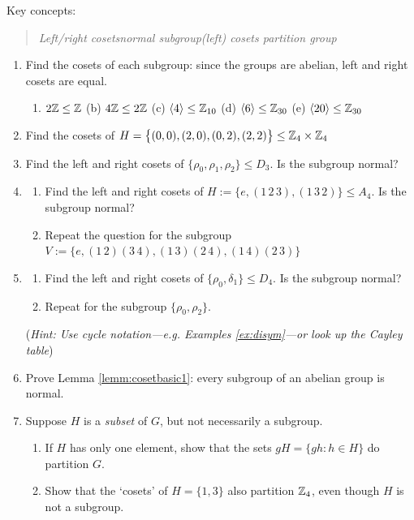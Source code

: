 \begin{exercises}{}{}
	Key concepts:
	\begin{quote}
		\emph{Left/right cosets\qquad normal subgroup\qquad (left) cosets partition group}
	\end{quote}

	\begin{enumerate}
	  \item Find the cosets of each subgroup: since the groups are abelian, left and right cosets are equal.
		\begin{enumerate}
	  	\item $2\mathbb{Z}\le\mathbb{Z}$\qquad\quad
	  	(b) $4\mathbb{Z}\le 2\mathbb{Z}$\qquad\quad
		  (c) $\left\langle 4\right\rangle\le\mathbb{Z}_{10}$\qquad\quad
		  (d) $\left\langle 6\right\rangle\le\mathbb{Z}_{30}$\qquad\quad
		  (e) $\left\langle 20\right\rangle\le\mathbb{Z}_{30}$
		\end{enumerate}
			
			
		\item\label{exs:VfactorV} Find the cosets of $H=\bigl\{(0,0),(2,0),(0,2),(2,2)\bigr\}\le\mathbb{Z}_4\times\mathbb{Z}_4$
			
			
		\item Find the left and right cosets of $\{\rho_0,\rho_1,\rho_2\}\le D_3$. Is the subgroup normal?
		
		
		\item\label{exs:va4}\begin{enumerate}
		  \item Find the left and right cosets of $H:=\{e,(1\,2\,3),(1\,3\,2)\}\le A_4$. Is the subgroup normal?
		  \item Repeat the question for the subgroup $V:=\{e,(1\,2)(3\,4),(1\,3)(2\,4),(1\,4)(2\,3)\}$
		\end{enumerate}
		
	
		\item\label{exs:d4normal}\begin{enumerate}
		  \item Find the left and right cosets of $\{\rho_0,\delta_1\}\le D_4$. Is the subgroup normal?
			\item Repeat for the subgroup $\{\rho_0,\rho_2\}$.
		\end{enumerate}
		(\emph{Hint: Use cycle notation---e.g. Examples \ref{ex:disym}---or look up the Cayley table})
	  
	  
	  \item Prove Lemma \ref{lemm:cosetbasic1}: every subgroup of an abelian group is normal.
	  
	  
	  \item\label{exs:partitioncoset} Suppose $H$ is a \emph{subset} of $G$, but not necessarily a subgroup.
	  \begin{enumerate}
	    \item If $H$ has only one element, show that the sets $gH=\{gh:h\in H\}$ do partition $G$.
	    \item Show that the `cosets' of $H=\{1,3\}$ also partition $\mathbb{Z}_4$, even though $H$ is not a subgroup.
	  \end{enumerate}
	  

\end{enumerate}
\end{exercises}
